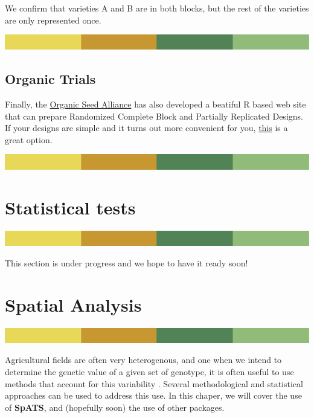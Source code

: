 \documentclass[
]{book}
\begin{document}
We confirm that varieties A and B are in both blocks, but the rest of the varieties are only represented once.

\includegraphics{rsrstrip.png}

\hypertarget{organic-trials}{%
\section{Organic Trials}\label{organic-trials}}

Finally, the \href{https://seedalliance.org/}{Organic Seed Alliance} has also developed a beatiful R based web site that can prepare Randomized Complete Block and Partially Replicated Designs. If your designs are simple and it turns out more convenient for you, \href{https://organicseed.shinyapps.io/OrganicTrials/}{this} is a great option.

\includegraphics{rsrstrip.png}

\hypertarget{statistical-tests}{%
\chapter{Statistical tests}\label{statistical-tests}}

\includegraphics{rsrstrip.png}

This section is under progress and we hope to have it ready soon!

\hypertarget{spatial-analysis}{%
\chapter{Spatial Analysis}\label{spatial-analysis}}

\includegraphics{rsrstrip.png}

Agricultural fields are often very heterogenous, and one when we intend to determine the genetic value of a given set of genotype, it is often useful to use methods that account for this variability \citep{singh2003spatial}. Several methodological and statistical approaches can be used to address this use. In this chaper, we will cover the use of \textbf{SpATS}, and (hopefully soon) the use of other packages.
\end{document}
